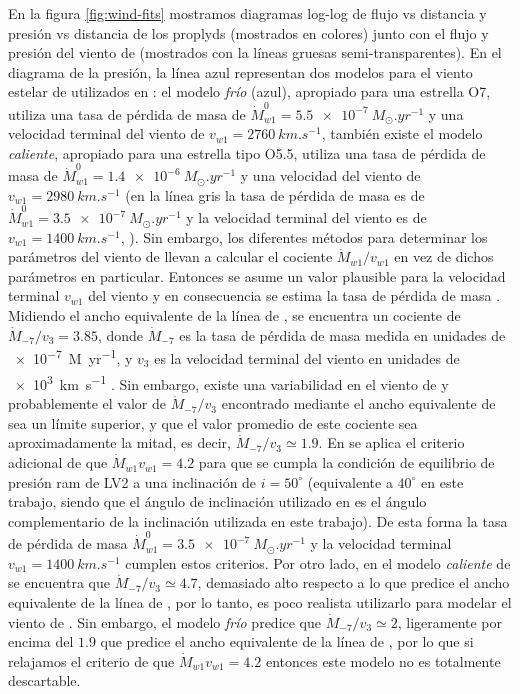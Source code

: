 En la figura \ref{fig:wind-fits} mostramos diagramas log-log de flujo vs distancia y presión vs distancia de los proplyds (mostrados en colores) junto con el flujo y presión del viento de \thC{} (mostrados con la líneas gruesas semi-transparentes). En el diagrama de la presión, la línea azul representan dos modelos para el viento estelar de \thC{} utilizados en \citet{Gagne:2005}: el modelo \textit{frío} (azul), apropiado para una estrella O7, utiliza una tasa de pérdida de masa de $\dot{M}^0_{w1} = \SI{5.5e-7}{M_\odot.yr^{-1}}$ y una velocidad terminal del viento de $v_{w1} = \SI{2760}{km.s^{-1}}$, también existe el modelo \textit{caliente}, apropiado para una estrella tipo O5.5, utiliza una tasa de pérdida de masa de $\dot{M}^0_{w1} = \SI{1.4e-6}{M_\odot.yr^{-1}}$ y una velocidad del viento de $v_{w1} = \SI{2980}{km.s^{-1}}$ (en la línea gris la tasa de pérdida de masa es de $\dot{M}^0_{w1} = \SI{3.5e-7}{M_\odot.yr^{-1}}$ y la velocidad terminal del viento es de $v_{w1} = \SI{1400}{km.s^{-1}}$, \citet{GAH:2002}). Sin embargo, los diferentes métodos para determinar los parámetros del viento de \thC{} llevan a calcular el cociente $\dot{M}_{w1}/v_{w1}$ en vez de dichos parámetros en particular. Entonces se asume un valor plausible para la velocidad terminal $v_{w1}$ del viento y en consecuencia se estima la tasa de pérdida de masa \citep{Garcia-Arredondo:2001}. Midiendo el ancho equivalente de la línea de , se encuentra un cociente de $\dot{M}_{-7}/v_{3} = 3.85$, donde $\dot{M}_{-7}$ es la tasa de pérdida de masa medida en unidades de \SI{e-7}{M_\odot.yr^{-1}}, y $v_3$ es la velocidad terminal del viento en unidades de \SI{e3}{km.s^{-1}} \citep{Garcia-Arredondo:2001}. Sin embargo, existe una variabilidad en el viento de \thC{} y probablemente el valor de  $\dot{M}_{-7}/v_{3}$ encontrado mediante el ancho equivalente de  sea un límite superior, y que el valor promedio de este cociente sea aproximadamente la mitad, es decir, $\dot{M}_{-7}/v_{3} \simeq 1.9$. En \citet{Garcia-Arredondo:2001} se aplica el criterio adicional de que $\dot{M}_{w1}v_{w1} = 4.2$ para que se cumpla la condición de equilibrio de presión ram de LV2 a una inclinación de $i=50^\circ$ (equivalente a $40^\circ$ en este trabajo, siendo que el ángulo de inclinación utilizado en \citet{Garcia-Arredondo:2001} es el ángulo complementario de la inclinación utilizada en este trabajo). De esta forma la tasa de pérdida de masa $\dot{M}^0_{w1} = \SI{3.5e-7}{M_\odot.yr^{-1}}$ y la velocidad terminal $v_{w1} = \SI{1400}{km.s^{-1}}$ cumplen estos criterios. Por otro lado, en el modelo \textit{caliente} de \citet{Gagne:2005} se encuentra que $\dot{M}_{-7}/v_{3} \simeq 4.7$, demasiado alto respecto a lo que predice el ancho equivalente de la línea de , por lo tanto, es poco realista utilizarlo para modelar el viento de \thC{}. Sin embargo, el modelo \textit{frío} predice que $\dot{M}_{-7}/v_{3} \simeq 2$, ligeramente por encima del $1.9$ que predice el ancho equivalente de la línea de , por lo que si relajamos el criterio de que $\dot{M}_{w1}v_{w1} = 4.2$ entonces este modelo no es totalmente descartable.

